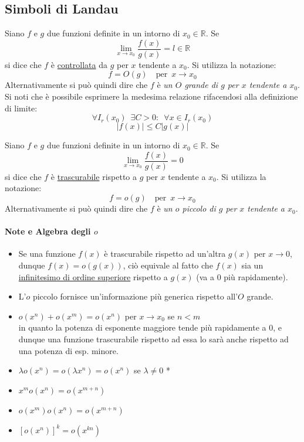 \documentclass[10pt]{article}
\theoremstyle{plain}
\begin{document}
\subsection{Simboli di Landau}
\begin{defin}
Siano $f$ e $g$ due funzioni definite in un intorno di $x_0 \in \mathbb{R}$. Se
\[\lim \limits_{x \rightarrow x_0} \frac{f(x)}{g(x)} = l \in \mathbb{R}\] si dice che $f$ è \underline{controllata} da $g$ per $x$ tendente a $x_0$. Si utilizza la notazione:
\[f = O(g) \quad \textrm{per} \enspace x \rightarrow x_0\]
Alternativamente si può quindi dire che $f$ è \textit{un $O$ grande di $g$ per $x$ tendente a $x_0$}.\\
Si noti che è possibile esprimere la medesima relazione rifacendosi alla definizione di limite:
\[\forall I_r(x_0) \enspace \exists C > 0 : \enspace \forall x \in I_r(x_0)\]
\[|f(x)| \leq C |g(x)|\]
\end{defin}

\begin{defin}
Siano $f$ e $g$ due funzioni definite in un intorno di $x_0 \in \mathbb{R}$. Se
\[\lim \limits_{x \rightarrow x_0} \frac{f(x)}{g(x)} = 0\] si dice che $f$ è \underline{trascurabile} rispetto a $g$ per $x$ tendente a $x_0$. Si utilizza la notazione:
\[f = o(g) \quad \textrm{per} \enspace x \rightarrow x_0\]
Alternativamente si può quindi dire che $f$ è \textit{un $o$ piccolo di $g$ per $x$ tendente a $x_0$}.
\end{defin}

\paragraph*{Note e Algebra degli $o$}
\begin{itemize}[label=$\ast$]
\item Se una funzione $f(x)$ è trascurabile rispetto ad un'altra $g(x)$ per $x \rightarrow 0$, dunque $f(x) = o(g(x))$, ciò equivale al fatto che $f(x)$ sia un \underline{infinitesimo di ordine superiore} rispetto a $g(x)$ (va a 0 più rapidamente).
\item L'$o$ piccolo fornisce un'informazione più generica rispetto all'$O$ grande.
\item $o(x^n) + o(x^m) = o(x^n)$ per $x \rightarrow x_0$ se $n < m$ \\ in quanto la potenza di esponente maggiore tende più rapidamente a 0, e dunque una funzione trascurabile rispetto ad essa lo sarà anche rispetto ad una potenza di esp. minore.
\item $\lambda o(x^n) = o(\lambda x^n) = o(x^n)$ se $\lambda \neq 0$ \hypertarget{opiccoli}{*}
\item $x^m o(x^n) = o(x^{m+n})$
\item $o(x^m) o(x^n) = o(x^{m+n})$
\item $[o(x^n)]^k = o(x^{kn})$
\end{itemize}
\end{document}
